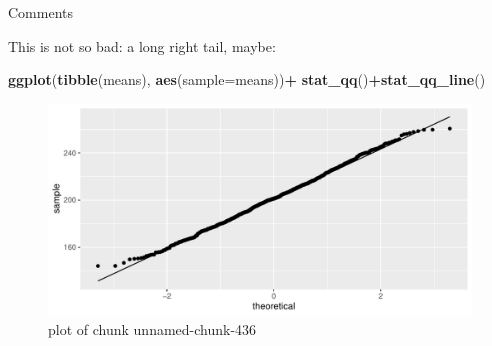 \documentclass[
  ignorenonframetext,
]{beamer}
\newenvironment{Shaded}{\begin{snugshade}}{\end{snugshade}}
\newcommand{\DataTypeTok}[1]{\textcolor[rgb]{0.13,0.29,0.53}{#1}}
\newcommand{\KeywordTok}[1]{\textcolor[rgb]{0.13,0.29,0.53}{\textbf{#1}}}
\newcommand{\NormalTok}[1]{#1}
\newcommand{\OperatorTok}[1]{\textcolor[rgb]{0.81,0.36,0.00}{\textbf{#1}}}
\newcommand{\StringTok}[1]{\textcolor[rgb]{0.31,0.60,0.02}{#1}}
\begin{document}
\begin{frame}[fragile]{Comments}
\protect\hypertarget{comments-27}{}

This is not so bad: a long right tail, maybe:

\begin{Shaded}
\begin{Highlighting}[]
\KeywordTok{ggplot}\NormalTok{(}\KeywordTok{tibble}\NormalTok{(means), }\KeywordTok{aes}\NormalTok{(}\DataTypeTok{sample=}\NormalTok{means))}\OperatorTok{+}
\StringTok{  }\KeywordTok{stat_qq}\NormalTok{()}\OperatorTok{+}\KeywordTok{stat_qq_line}\NormalTok{()}
\end{Highlighting}
\end{Shaded}

\begin{figure}
\centering
\includegraphics{figure/unnamed-chunk-436-1.pdf}
\caption{plot of chunk unnamed-chunk-436}
\end{figure}

\end{frame}
\end{document}
